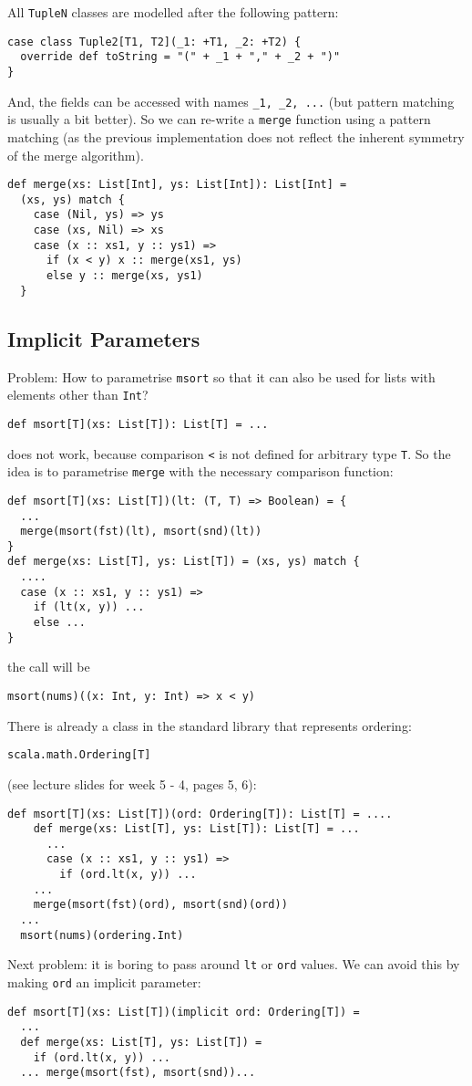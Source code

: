 \documentclass{scrartcl}
\begin{document}
All \lstinline|TupleN| classes are modelled after the following pattern:
\begin{lstlisting}
case class Tuple2[T1, T2](_1: +T1, _2: +T2) {
  override def toString = "(" + _1 + "," + _2 + ")"
}
\end{lstlisting}
And, the fields can be accessed with names \lstinline|_1, _2, ...| (but pattern
matching is usually a bit better). So we can re-write a \lstinline|merge|
function using a pattern matching (as the previous implementation does not
reflect the inherent symmetry of the merge algorithm).
\begin{lstlisting}
def merge(xs: List[Int], ys: List[Int]): List[Int] = 
  (xs, ys) match {
    case (Nil, ys) => ys
    case (xs, Nil) => xs
    case (x :: xs1, y :: ys1) =>
      if (x < y) x :: merge(xs1, ys)
      else y :: merge(xs, ys1)
  }
\end{lstlisting}

\subsection{Implicit Parameters}
\label{sec:ImplicitParameters}

Problem: How to parametrise \lstinline|msort| so that it can also be used for
lists with elements other than \lstinline|Int|?
\begin{lstlisting}
def msort[T](xs: List[T]): List[T] = ...
\end{lstlisting}
does not work, because comparison \lstinline|<| is not defined for arbitrary
type \lstinline|T|. So the idea is to parametrise \lstinline|merge| with the
necessary comparison function:
\begin{lstlisting}
def msort[T](xs: List[T])(lt: (T, T) => Boolean) = {
  ...
  merge(msort(fst)(lt), msort(snd)(lt))
}
def merge(xs: List[T], ys: List[T]) = (xs, ys) match {
  ....
  case (x :: xs1, y :: ys1) =>
    if (lt(x, y)) ...
    else ...
}
\end{lstlisting}
the call will be
\begin{lstlisting}
msort(nums)((x: Int, y: Int) => x < y)
\end{lstlisting}

There is already a class in the standard library that represents ordering:
\begin{lstlisting}
scala.math.Ordering[T]
\end{lstlisting}
(see lecture slides for week 5 - 4, pages 5, 6):
\begin{lstlisting}
def msort[T](xs: List[T])(ord: Ordering[T]): List[T] = ....
    def merge(xs: List[T], ys: List[T]): List[T] = ...
      ...
      case (x :: xs1, y :: ys1) =>
        if (ord.lt(x, y)) ...
    ...
    merge(msort(fst)(ord), msort(snd)(ord))
  ...
  msort(nums)(ordering.Int)
\end{lstlisting}
Next problem: it is boring to pass around \lstinline|lt| or \lstinline|ord|
values. We can avoid this by making \lstinline|ord| an implicit parameter:
\begin{lstlisting}
def msort[T](xs: List[T])(implicit ord: Ordering[T]) =
  ...
  def merge(xs: List[T], ys: List[T]) =
    if (ord.lt(x, y)) ...
  ... merge(msort(fst), msort(snd))...
\end{lstlisting}
\end{document}
